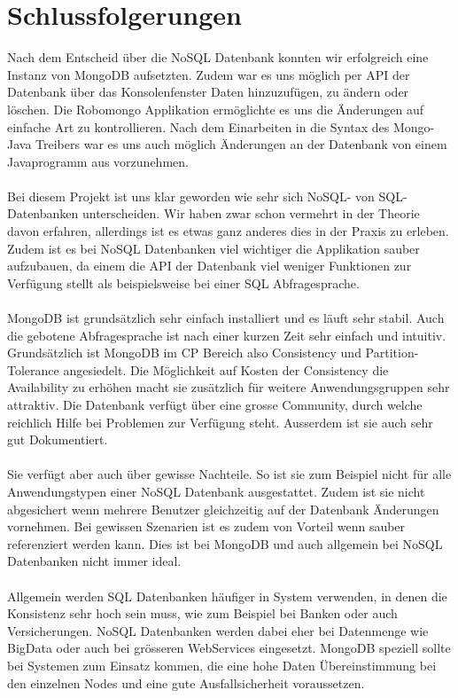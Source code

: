\section{Schlussfolgerungen}

Nach dem Entscheid über die NoSQL Datenbank konnten wir erfolgreich eine Instanz von MongoDB aufsetzten. Zudem war es uns möglich per API der Datenbank über das Konsolenfenster Daten hinzuzufügen, zu ändern oder löschen. Die Robomongo Applikation ermöglichte es uns die Änderungen auf einfache Art zu kontrollieren. Nach dem Einarbeiten in die Syntax des Mongo-Java Treibers war es uns auch möglich Änderungen an der Datenbank von einem Javaprogramm aus vorzunehmen.
\\\\
Bei diesem Projekt ist uns klar geworden wie sehr sich NoSQL- von SQL-Datenbanken unterscheiden. Wir haben zwar schon vermehrt in der Theorie davon erfahren, allerdings ist es etwas ganz anderes dies in der Praxis zu erleben. Zudem ist es bei NoSQL Datenbanken viel wichtiger die Applikation sauber aufzubauen, da einem die API der Datenbank viel weniger Funktionen zur Verfügung stellt als beispielsweise bei einer SQL Abfragesprache. 
\\\\
MongoDB ist grundsätzlich sehr einfach installiert und es läuft sehr stabil. Auch die gebotene Abfragesprache ist nach einer kurzen Zeit sehr einfach und intuitiv. Grundsätzlich ist MongoDB im CP Bereich also Consistency und Partition-Tolerance angesiedelt. Die Möglichkeit auf Kosten der Consistency die Availability zu erhöhen macht sie zusätzlich für weitere Anwendungsgruppen sehr attraktiv. Die Datenbank verfügt über eine grosse Community, durch welche reichlich Hilfe bei Problemen zur Verfügung steht. Ausserdem ist sie auch sehr gut Dokumentiert.
\\\\
Sie verfügt aber auch über gewisse Nachteile. So ist sie zum Beispiel nicht für alle Anwendungstypen einer NoSQL Datenbank ausgestattet. Zudem ist sie nicht abgesichert wenn mehrere Benutzer gleichzeitig auf der Datenbank Änderungen vornehmen. Bei gewissen Szenarien ist es zudem von Vorteil wenn sauber referenziert werden kann. Dies ist bei MongoDB und auch allgemein bei NoSQL Datenbanken nicht immer ideal.
\\\\
Allgemein werden SQL Datenbanken häufiger in System verwenden, in denen die Konsistenz sehr hoch sein muss, wie zum Beispiel bei Banken oder auch Versicherungen. NoSQL Datenbanken werden dabei eher bei Datenmenge wie BigData oder auch bei grösseren WebServices eingesetzt. MongoDB speziell sollte bei Systemen zum Einsatz kommen, die eine hohe Daten Übereinstimmung bei den einzelnen Nodes und eine gute Ausfallsicherheit voraussetzen.

